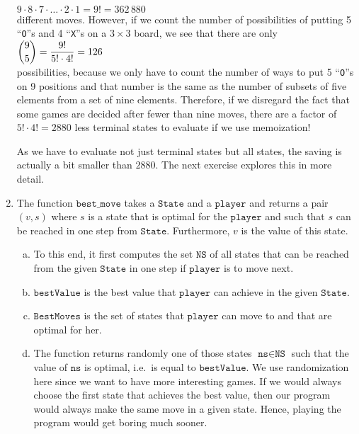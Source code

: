 \begin{enumerate}
      \\[0.2cm]
      \hspace*{1.3cm}
      $9 \cdot 8 \cdot 7 \cdot {\dots} \cdot 2 \cdot 1 = 9! = 362\,880$
      \\[0.2cm]
      different moves.  However, if we count the number of possibilities of putting 5 ``\texttt{O}''s and 4
      ``\texttt{X}''s on a $3 \times 3$ board, we see that there are only
      \\[0.2cm]
      \hspace*{1.3cm}
      $\displaystyle {9 \choose 5} = \frac{9!}{5! \cdot 4!} = 126$
      \\[0.2cm]
      possibilities, because we only have to count the number of ways to put 5 ``\texttt{O}''s on
      9 positions and that number is the same as the number of subsets of five elements from a set of nine elements.
      Therefore, if we disregard the fact that some games are decided after fewer than nine moves,  there are a
      factor of $5! \cdot 4! = 2880$ less terminal states to evaluate if we use memoization!

      As we have to evaluate not just terminal states but all states, the saving is actually a bit smaller than
      $2880$.  The next exercise explores this in more detail.
\item The function $\texttt{best\_move}$ takes a $\texttt{State}$ and a $\texttt{player}$ and returns a pair $(v,s)$
      where $s$ is a state that is optimal for the $\texttt{player}$ and such that $s$ can be reached in one step from
      $\texttt{State}$.  Furthermore, $v$ is the value of this state.
      \begin{enumerate}[(a)]
      \item To this end, it first computes the set $\texttt{NS}$ of all states that can be reached 
            from the given $\texttt{State}$ in one step if $\texttt{player}$ is to move next.
      \item $\texttt{bestValue}$ is the best value that $\texttt{player}$ can achieve in the given $\texttt{State}$.
      \item $\texttt{BestMoves}$ is the set of states that  $\texttt{player}$ can move to and that are optimal
            for her.
      \item The function returns randomly one of those states $\texttt{ns} \in \texttt{NS}$ such that 
            the value of $\texttt{ns}$ is optimal, i.e.~is equal to $\texttt{bestValue}$.
            We use randomization here since we want to have more interesting games.  If we would always choose
            the first state that achieves the best value, then our program would always make the same move in
            a given state.  Hence, playing the program would get boring much sooner.
      \end{enumerate}
\end{enumerate}

